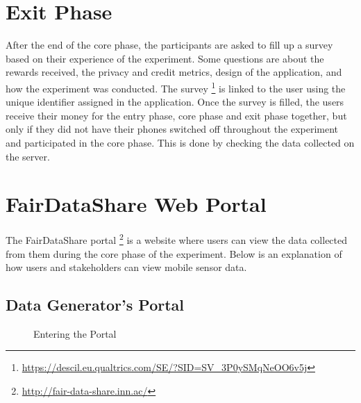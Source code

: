 \section{Exit Phase}

After the end of the core phase, the participants are asked to fill up a survey based on their experience of the experiment. Some questions are
about the rewards received, the privacy and credit metrics, design of the application, and how the experiment was conducted. The survey \footnote{\url{https://descil.eu.qualtrics.com/SE/?SID=SV_3P0ySMqNeOO6v5j}} is linked to the user using the unique identifier assigned in the application. Once the survey is filled, the users receive their money for the entry phase, core phase and exit phase together, but only if they did not have their phones switched off throughout the experiment and participated in the core phase. This is done by checking the data collected on the server.

\section{FairDataShare Web Portal} \label{fds}

The FairDataShare portal \footnote{\url{http://fair-data-share.inn.ac/}} is a website where users can view the data collected from them during the core phase of the experiment. Below is an explanation of how users and stakeholders can view mobile sensor data.


\subsection{Data Generator's Portal}

\begin{figure}[htp]
  \hspace{1em}\hspace{1em}
  \caption{Entering the Portal}
  \label{fig:fds1}
\end{figure}

